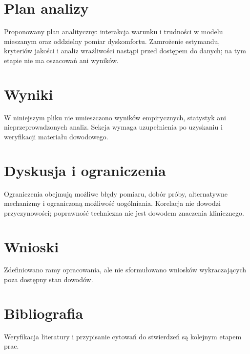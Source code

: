 \documentclass[11pt,a4paper]{article}
\begin{document}
\section{Plan analizy}

Proponowany plan analityczny: interakcja warunku i trudności w modelu mieszanym oraz oddzielny pomiar dyskomfortu. Zamrożenie estymandu, kryteriów jakości i analiz wrażliwości nastąpi przed dostępem do danych; na tym etapie nie ma oszacowań ani wyników.

\section{Wyniki}

W niniejszym pliku nie umieszczono wyników empirycznych, statystyk ani nieprzeprowadzonych analiz. Sekcja wymaga uzupełnienia po uzyskaniu i weryfikacji materiału dowodowego.

\section{Dyskusja i ograniczenia}

Ograniczenia obejmują możliwe błędy pomiaru, dobór próby, alternatywne mechanizmy i ograniczoną możliwość uogólniania. Korelacja nie dowodzi przyczynowości; poprawność techniczna nie jest dowodem znaczenia klinicznego.

\section{Wnioski}

Zdefiniowano ramy opracowania, ale nie sformułowano wniosków wykraczających poza dostępny stan dowodów.

\section*{Bibliografia}

Weryfikacja literatury i przypisanie cytowań do stwierdzeń są kolejnym etapem prac.
\end{document}
